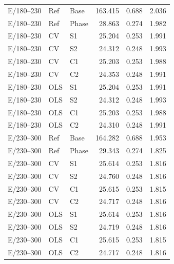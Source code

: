 \documentclass[11pt,a4paper]{article}
\begin{document}
\begin{longtable}{lllr rr}
E/180--230 & Ref & Base & 163.415 & 0.688 & 2.036\\
E/180--230 & Ref & Phase & 28.863 & 0.274 & 1.982\\
E/180--230 & CV & S1 & 25.204 & 0.253 & 1.991\\
E/180--230 & CV & S2 & 24.312 & 0.248 & 1.993\\
E/180--230 & CV & C1 & 25.203 & 0.253 & 1.988\\
E/180--230 & CV & C2 & 24.353 & 0.248 & 1.991\\
E/180--230 & OLS & S1 & 25.204 & 0.253 & 1.991\\
E/180--230 & OLS & S2 & 24.312 & 0.248 & 1.993\\
E/180--230 & OLS & C1 & 25.203 & 0.253 & 1.988\\
E/180--230 & OLS & C2 & 24.310 & 0.248 & 1.991\\
E/230--300 & Ref & Base & 164.282 & 0.688 & 1.953\\
E/230--300 & Ref & Phase & 29.343 & 0.274 & 1.825\\
E/230--300 & CV & S1 & 25.614 & 0.253 & 1.816\\
E/230--300 & CV & S2 & 24.760 & 0.248 & 1.816\\
E/230--300 & CV & C1 & 25.615 & 0.253 & 1.815\\
E/230--300 & CV & C2 & 24.717 & 0.248 & 1.816\\
E/230--300 & OLS & S1 & 25.614 & 0.253 & 1.816\\
E/230--300 & OLS & S2 & 24.719 & 0.248 & 1.816\\
E/230--300 & OLS & C1 & 25.615 & 0.253 & 1.815\\
E/230--300 & OLS & C2 & 24.717 & 0.248 & 1.816\\
\bottomrule\end{longtable}\normalsize
\end{document}
